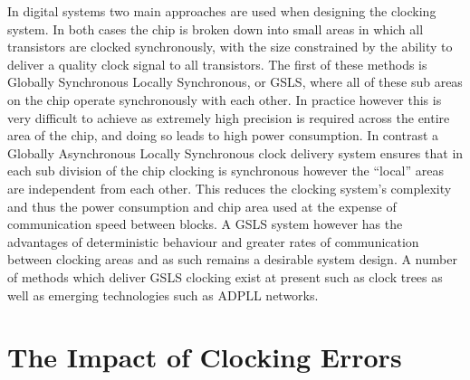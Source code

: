 \documentclass[11pt,english,british]{report}
\begin{document}
In digital systems two main approaches are used when designing the clocking system. In both cases the chip is broken down into small areas in which all transistors are clocked synchronously, with the size constrained by the ability to deliver a quality clock signal to all transistors. The first of these methods is Globally Synchronous Locally Synchronous, or GSLS, where all of these sub areas on the chip operate synchronously with each other. In practice however this is very difficult to achieve as extremely high precision is required across the entire area of the chip, and doing so leads to high power consumption.
In contrast a Globally Asynchronous Locally Synchronous clock delivery system ensures that in each sub division of the chip clocking is synchronous however the ``local'' areas are independent from each other. This reduces the clocking system's complexity and thus the power consumption and chip area used at the expense of communication speed between blocks. %
A GSLS system however has the advantages of deterministic behaviour and greater rates of communication between clocking areas and as such remains a desirable system design. A number of methods which deliver GSLS clocking exist at present such as clock trees as well as emerging technologies such as ADPLL networks.

\section{The Impact of Clocking Errors}
\end{document}
